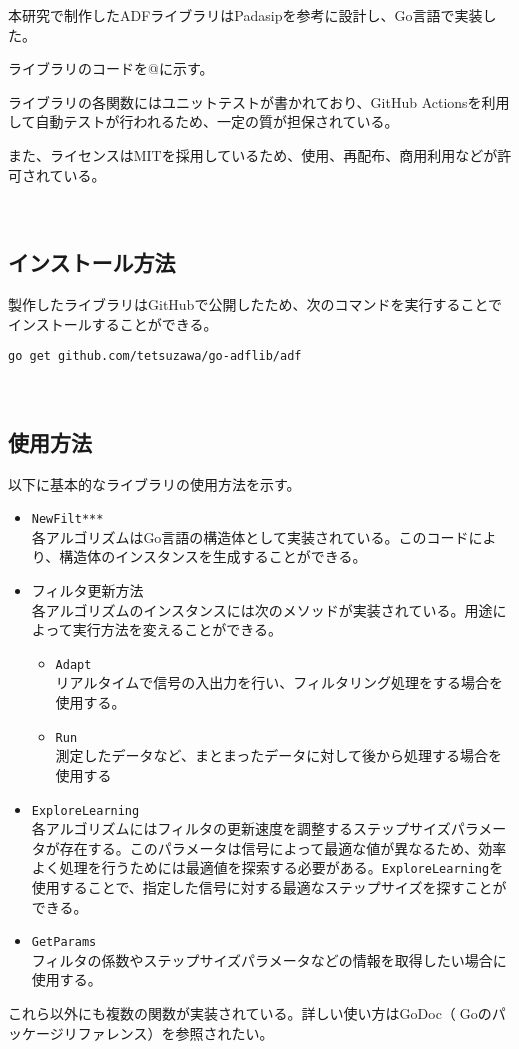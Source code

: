 本研究で制作したADFライブラリはPadasipを参考に設計し、Go言語で実装した。

ライブラリのコードを@に示す。

ライブラリの各関数にはユニットテストが書かれており、GitHub
Actionsを利用して自動テストが行われるため、一定の質が担保されている。

また、ライセンスはMITを採用しているため、使用、再配布、商用利用などが許可されている。%

\
\subsection{インストール方法}\label{how-to-install}

製作したライブラリはGitHub\cite{go-adflib:online}で公開したため、次のコマンドを実行することでインストールすることができる。

\texttt{go\ get\ github.com/tetsuzawa/go-adflib/adf}

\
\subsection{使用方法}\label{how-to-use}

以下に基本的なライブラリの使用方法を示す。

\begin{itemize}
\tightlist
\item
  \texttt{NewFilt***} \\ 
  各アルゴリズムはGo言語の構造体として実装されている。このコードにより、構造体のインスタンスを生成することができる。
\item
  フィルタ更新方法 \\
  各アルゴリズムのインスタンスには次のメソッドが実装されている。用途によって実行方法を変えることができる。

  \begin{itemize}
  \tightlist
  \item
    \texttt{Adapt} \\
    リアルタイムで信号の入出力を行い、フィルタリング処理をする場合を使用する。
  \item
    \texttt{Run} \\
    測定したデータなど、まとまったデータに対して後から処理する場合を使用する
  \end{itemize}
\item
  \texttt{ExploreLearning} \\
  各アルゴリズムにはフィルタの更新速度を調整するステップサイズパラメータが存在する。このパラメータは信号によって最適な値が異なるため、効率よく処理を行うためには最適値を探索する必要がある。\texttt{ExploreLearning}を使用することで、指定した信号に対する最適なステップサイズを探すことができる。
\item
  \texttt{GetParams} \\
  フィルタの係数やステップサイズパラメータなどの情報を取得したい場合に使用する。
\end{itemize}

これら以外にも複数の関数が実装されている。詳しい使い方はGoDoc（Goのパッケージリファレンス）\cite{godoc:online}を参照されたい。
